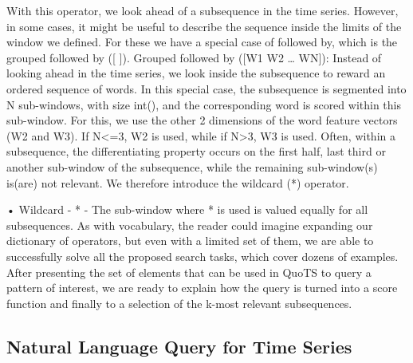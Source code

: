 {With this operator, we look ahead of a subsequence in the time series. However, in some cases, it might be useful to describe the sequence inside the limits of the window we defined. For these we have a special case of followed by, which is the grouped followed by ([ ]). 
	Grouped followed by ([W1 W2 … WN]): Instead of looking ahead in the time series, we look inside the subsequence to reward an ordered sequence of words. In this special case, the subsequence is segmented into N sub-windows, with size int(), and the corresponding word is scored within this sub-window. For this, we use the other 2 dimensions of the word feature vectors (W2 and W3). If N<=3, W2 is used, while if N>3, W3 is used.
Often, within a subsequence, the differentiating property occurs on the first half, last third or another sub-window of the subsequence, while the remaining sub-window(s) is(are) not relevant. We therefore introduce the wildcard (*) operator.

•	Wildcard - * - The sub-window where * is used is valued equally for all subsequences.
As with vocabulary, the reader could imagine expanding our dictionary of operators, but even with a limited set of them, we are able to successfully solve all the proposed search tasks, which cover dozens of examples. 
After presenting the set of elements that can be used in QuoTS to query a pattern of interest, we are ready to explain how the query is turned into a score function and finally to a selection of the k-most relevant subsequences. 



\subsection{Natural Language Query for Time Series}


}
